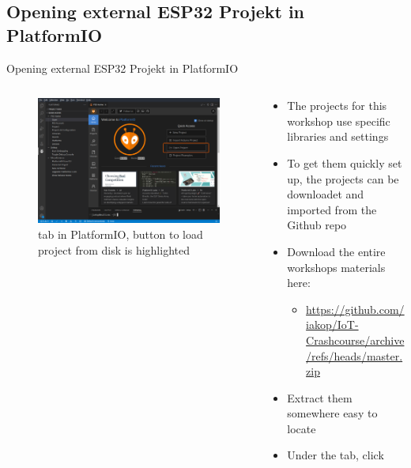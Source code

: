 \documentclass[aspectratio=169]{beamer}
\begin{document}
\subsection{Opening external ESP32 Projekt in PlatformIO}
\begin{frame}{Opening external ESP32 Projekt in PlatformIO}
\begin{columns}
	\begin{column}{0.5\textwidth}
		\begin{figure}
  			\includegraphics[width=\textwidth,keepaspectratio=true]{assets/pictures/pio-import.png}
  			\caption{ tab in PlatformIO, button to load project from disk is highlighted}
  			\label{fig:pio-project4}
		\end{figure}
	\end{column}
	\begin{column}{0.5\textwidth}
		\begin{textBox}
			\begin{itemize}
				\item The projects for this workshop use specific libraries and settings
				\item To get them quickly set up, the projects can be downloadet and imported from the Github repo
				\item Download the entire workshops materials here:
				\begin{itemize}
					\item \small\url{https://github.com/iakop/IoT-Crashcourse/archive/refs/heads/master.zip}
				\end{itemize}
				\item Extract them somewhere easy to locate
				\item Under the  tab, click 
			\end{itemize}
		\end{textBox}
	\end{column}
\end{columns}
\end{frame}
\end{document}
